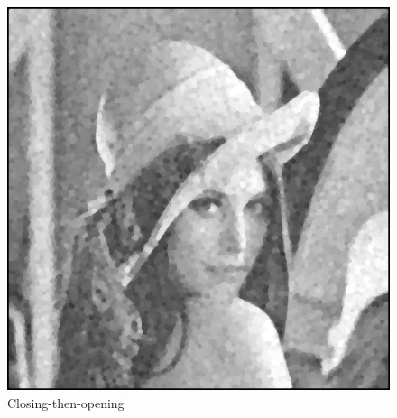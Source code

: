 \documentclass{article}
\begin{document}
\begin{figure}[H]
  \includegraphics[width=\linewidth]{img/g30_close_then_open.png}
  \caption{Closing-then-opening}\label{fig:g30_close_then_open}
\endminipage\hfill
\end{figure}
\end{document}
